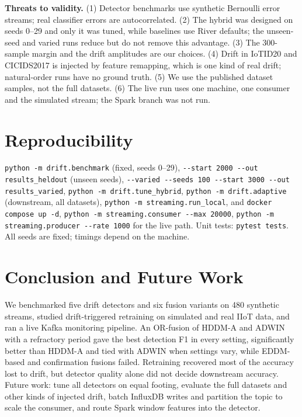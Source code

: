 \documentclass[conference]{IEEEtran}
\begin{document}
\textbf{Threats to validity.} (1) Detector benchmarks use synthetic Bernoulli error streams; real classifier errors are autocorrelated. (2) The hybrid was designed on seeds 0--29 and only it was tuned, while baselines use River defaults; the unseen-seed and varied runs reduce but do not remove this advantage. (3) The 300-sample margin and the drift amplitudes are our choices. (4) Drift in IoTID20 and CICIDS2017 is injected by feature remapping, which is one kind of real drift; natural-order runs have no ground truth. (5) We use the published dataset samples, not the full datasets. (6) The live run uses one machine, one consumer and the simulated stream; the Spark branch was not run.

\section{Reproducibility}
\texttt{python -m drift.benchmark} (fixed, seeds 0--29), \texttt{-{}-start 2000 -{}-out results\_heldout} (unseen seeds), \texttt{-{}-varied -{}-seeds 100 -{}-start 3000 -{}-out results\_varied}, \texttt{python -m drift.tune\_hybrid}, \texttt{python -m drift.adaptive} (downstream, all datasets), \texttt{python -m streaming.run\_local}, and \texttt{docker compose up -d}, \texttt{python -m streaming.consumer -{}-max 20000}, \texttt{python -m streaming.producer -{}-rate 1000} for the live path. Unit tests: \texttt{pytest tests}. All seeds are fixed; timings depend on the machine.

\section{Conclusion and Future Work}
We benchmarked five drift detectors and six fusion variants on 480 synthetic streams, studied drift-triggered retraining on simulated and real IIoT data, and ran a live Kafka monitoring pipeline. An OR-fusion of HDDM-A and ADWIN with a refractory period gave the best detection F1 in every setting, significantly better than HDDM-A and tied with ADWIN when settings vary, while EDDM-based and confirmation fusions failed. Retraining recovered most of the accuracy lost to drift, but detector quality alone did not decide downstream accuracy. Future work: tune all detectors on equal footing, evaluate the full datasets and other kinds of injected drift, batch InfluxDB writes and partition the topic to scale the consumer, and route Spark window features into the detector.
\end{document}
